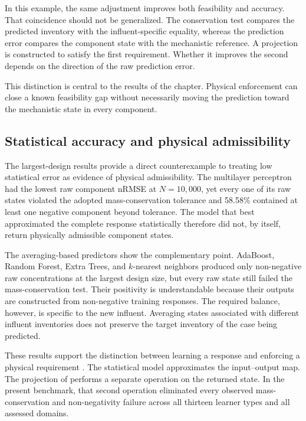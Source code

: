 In this example, the same adjustment improves both feasibility and accuracy. That coincidence should not be generalized. The conservation test compares the predicted inventory with the influent-specific equality, whereas the prediction error compares the component state with the mechanistic reference. A projection is constructed to satisfy the first requirement. Whether it improves the second depends on the direction of the raw prediction error.

This distinction is central to the results of the chapter. Physical enforcement can close a known feasibility gap without necessarily moving the prediction toward the mechanistic state in every component.

\subsection{Statistical accuracy and physical admissibility}

The largest-design results provide a direct counterexample to treating low statistical error as evidence of physical admissibility. The multilayer perceptron had the lowest raw component nRMSE at $N=10{,}000$, yet every one of its raw states violated the adopted mass-conservation tolerance and 58.58\% contained at least one negative component beyond tolerance. The model that best approximated the complete response statistically therefore did not, by itself, return physically admissible component states.

The averaging-based predictors show the complementary point. AdaBoost, Random Forest, Extra Trees, and $k$-nearest neighbors produced only non-negative raw concentrations at the largest design size, but every raw state still failed the mass-conservation test. Their positivity is understandable because their outputs are constructed from non-negative training responses. The required balance, however, is specific to the new influent. Averaging states associated with different influent inventories does not preserve the target inventory of the case being predicted.

These results support the distinction between learning a response and enforcing a physical requirement \citep{Kashinath2021,Hansen2024}. The statistical model approximates the input--output map. The projection of \citet{KircherVotsmeier2025} performs a separate operation on the returned state. In the present benchmark, that second operation eliminated every observed mass-conservation and non-negativity failure across all thirteen learner types and all assessed domains.


